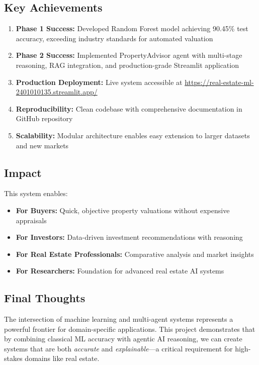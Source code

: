\documentclass[11pt,a4paper]{article}
\begin{document}
\subsection{Key Achievements}

\begin{enumerate}
    \item \textbf{Phase 1 Success:} Developed Random Forest model achieving 90.45\% test accuracy, exceeding industry standards for automated valuation
    
    \item \textbf{Phase 2 Success:} Implemented PropertyAdvisor agent with multi-stage reasoning, RAG integration, and production-grade Streamlit application
    
    \item \textbf{Production Deployment:} Live system accessible at \url{https://real-estate-ml-2401010135.streamlit.app/}
    
    \item \textbf{Reproducibility:} Clean codebase with comprehensive documentation in GitHub repository
    
    \item \textbf{Scalability:} Modular architecture enables easy extension to larger datasets and new markets
\end{enumerate}

\subsection{Impact}

This system enables:
\begin{itemize}
    \item \textbf{For Buyers:} Quick, objective property valuations without expensive appraisals
    \item \textbf{For Investors:} Data-driven investment recommendations with reasoning
    \item \textbf{For Real Estate Professionals:} Comparative analysis and market insights
    \item \textbf{For Researchers:} Foundation for advanced real estate AI systems
\end{itemize}

\subsection{Final Thoughts}

The intersection of machine learning and multi-agent systems represents a powerful frontier for domain-specific applications. This project demonstrates that by combining classical ML accuracy with agentic AI reasoning, we can create systems that are both \textit{accurate} and \textit{explainable}—a critical requirement for high-stakes domains like real estate.
\end{document}
